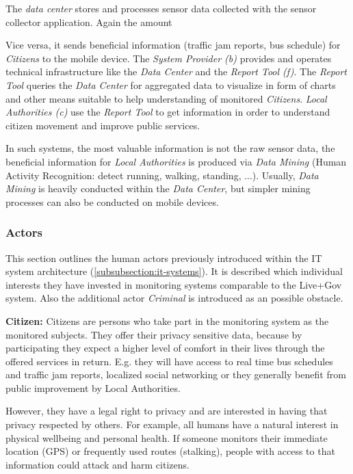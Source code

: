 The \emph{data center} stores and processes sensor data collected with the sensor collector application.
Again the amount 

Vice versa, it sends beneficial information (traffic jam reports, bus schedule) for \textit{Citizens} to the mobile device.
The \textit{System Provider (b)} provides and operates technical infrastructure like the \textit{Data Center} and the \textit{Report Tool (f)}.
The \textit{Report Tool} queries the \textit{Data Center} for aggregated data to visualize in form of charts and other means suitable to help understanding of monitored \textit{Citizens}. 
\textit{Local Authorities (c)} use the \textit{Report Tool} to get information in order to understand citizen movement and improve public services. 

In such systems, the most valuable information is not the raw sensor data, the beneficial information for \textit{Local Authorities} is produced via \textit{Data Mining} (Human Activity Recognition: detect running, walking, standing, ...). 
Usually, \textit{Data Mining} is heavily conducted within the \textit{Data Center}, but simpler mining processes can also be conducted on mobile devices.



\subsubsection{Actors}
\label{subsubsection:humans}

This section outlines the human actors previously introduced within the IT system architecture (\ref{subsubsection:it-systems}).
It is described which individual interests they have invested in monitoring systems comparable to the Live+Gov system. 
Also the additional actor \textit{Criminal} is introduced as an possible obstacle.

\textbf{Citizen:} 
Citizens are persons who take part in the monitoring system as the monitored subjects.
They offer their privacy sensitive data, because by participating they expect a higher level of comfort in their lives through the offered services in return.
E.g. they will have access to real time bus schedules and traffic jam reports, localized social networking or they generally benefit from public improvement by Local Authorities.

However, they have a legal right to privacy and are interested in having that privacy respected by others.
For example, all humans have a natural interest in physical wellbeing and personal health. 
If someone monitors their immediate location (GPS) or frequently used routes (stalking), people with access to that information could attack and harm citizens.


